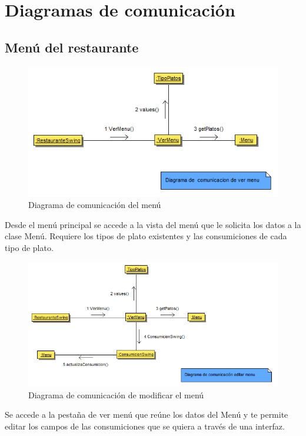 \documentclass[spanish,a4paper,11pt, twoside]{report}	%
\begin{document}
	\section{Diagramas de comunicación}
		\subsection{Menú del restaurante}

		\begin{figure}[!h]
		\centering
		\includegraphics[scale=0.5]{DCvermenu.png}
		\caption{Diagrama de comunicación del menú}
		\end{figure}
		Desde el menú principal se accede a la vista del menú que le solicita los datos a la clase Menú.
		Requiere los tipos de plato existentes y las consumiciones de cada tipo de plato. 

		\begin{figure}[!h]
		\centering
		\includegraphics[scale=0.5]{DCeditarmenu.png}
		\caption{Diagrama de comunicación de modificar el menú}
		\end{figure}
		Se accede  a la pestaña de ver menú que reúne los datos del Menú y te
		permite editar los campos de las consumiciones que se quiera a través de una
		interfaz.
\end{document}
